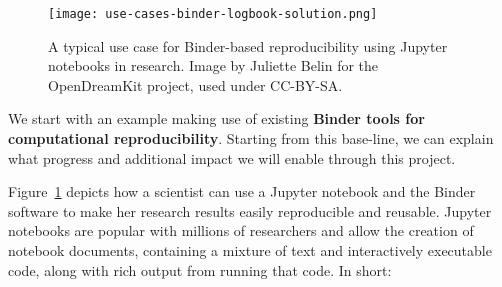 \begin{figure}[htb]\centering
  \texttt{[image: use-cases-binder-logbook-solution.png]}
  \caption{A typical use case for Binder-based reproducibility using Jupyter notebooks in research.
            Image by Juliette Belin for the OpenDreamKit project, used under
            CC-BY-SA.}\label{fig:use-cases-binder}
\end{figure}

We start with an example making use of existing \textbf{Binder
tools for computational reproducibility}. Starting from this base-line, we can
explain what progress and additional impact we will enable through this project.

Figure~\ref{fig:use-cases-binder} depicts how a scientist can use a Jupyter
notebook and the Binder software to make her research results easily
reproducible and reusable. Jupyter notebooks are popular with millions of researchers and allow the creation of notebook
documents, containing a mixture of text and interactively executable code, along with rich output from
running that code. In short:
